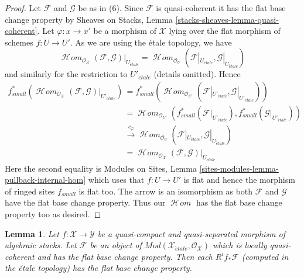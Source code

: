\documentclass{stacks-project}
\theoremstyle{plain}
\newtheorem{lemma}[subsection]{Lemma}
\theoremstyle{definition}
\theoremstyle{remark}
\numberwithin{equation}{subsection}
\def\SheafHom{\mathop{\mathcal{H}\!\mathit{om}}\nolimits}
\def\etale{{\acute{e}tale}}
\begin{document}
\begin{proof}
\medskip\noindent
Let $\mathcal{F}$ and $\mathcal{G}$ be as in (6). Since $\mathcal{F}$
is quasi-coherent it has the flat base change property by
Sheaves on Stacks, Lemma \ref{stacks-sheaves-lemma-quasi-coherent}.
Let $\varphi : x \to x'$ be a morphism of $\mathcal{X}$ lying
over the flat morphism of schemes $f : U \to U'$.
As we are using the \'etale topology, we have
$$
\SheafHom_{\mathcal{O}_\mathcal{X}}(\mathcal{F}, \mathcal{G})|_{U_\etale} =
\SheafHom_{\mathcal{O}_U}(\mathcal{F}|_{U_\etale}, \mathcal{G}|_{U_\etale})
$$
and similarly for the restriction to $U'_\etale$ (details omitted). Hence
\begin{align*}
f_{small}^*(
\SheafHom_{\mathcal{O}_\mathcal{X}}(\mathcal{F}, \mathcal{G})|_{U'_\etale})
& =
f_{small}^*(
\SheafHom_{\mathcal{O}_{U'}}(
\mathcal{F}|_{U'_\etale}, \mathcal{G}|_{U'_\etale})) \\
& =
\SheafHom_{\mathcal{O}_{U'}}(
f_{small}^*(\mathcal{F}|_{U'_\etale}),
f_{small}^*(\mathcal{G}|_{U'_\etale})) \\
& \xrightarrow{c_\varphi}
\SheafHom_{\mathcal{O}_U}(\mathcal{F}|_{U_\etale}, \mathcal{G}|_{U_\etale}) \\
& =
\SheafHom_{\mathcal{O}_\mathcal{X}}(\mathcal{F}, \mathcal{G})|_{U_\etale}
\end{align*}
Here the second equality is
Modules on Sites, Lemma \ref{sites-modules-lemma-pullback-internal-hom}
which uses that $f : U \to U'$ is flat and hence the morphism
of ringed sites $f_{small}$ is flat too.
The arrow is an isomorphism as both $\mathcal{F}$ and $\mathcal{G}$
have the flat base change property. Thus our $\SheafHom$
has the flat base change property too as desired.
\end{proof}

\begin{lemma}
\label{lemma-flat-comparison}
Let $f : \mathcal{X} \to \mathcal{Y}$ be a quasi-compact and
quasi-separated morphism of algebraic stacks. Let 
$\mathcal{F}$ be an object of
$\textit{Mod}(\mathcal{X}_\etale, \mathcal{O}_\mathcal{X})$
which is locally quasi-coherent and has the flat base change property.
Then each $R^if_*\mathcal{F}$ (computed in the \'etale topology)
has the flat base change property.
\end{lemma}
\end{document}
